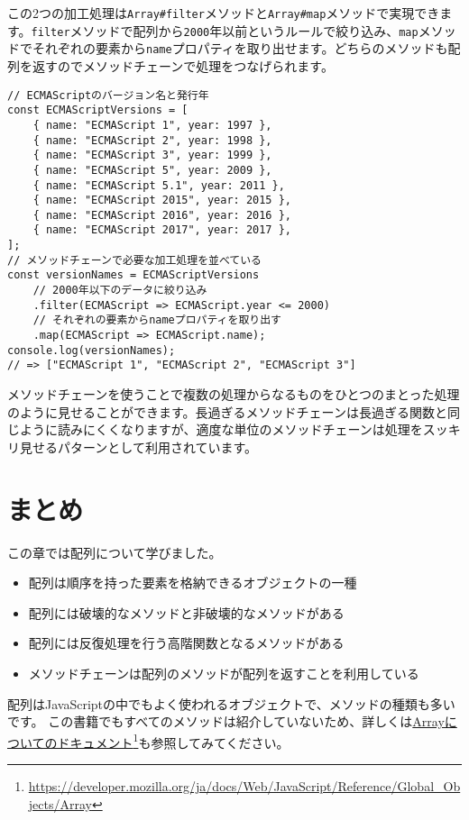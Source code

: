 この2つの加工処理は\texttt{Array\#filter}メソッドと\texttt{Array\#map}メソッドで実現できます。\texttt{filter}メソッドで配列から\texttt{2000}年以前というルールで絞り込み、\texttt{map}メソッドでそれぞれの要素から\texttt{name}プロパティを取り出せます。どちらのメソッドも配列を返すのでメソッドチェーンで処理をつなげられます。

\begin{lstlisting}
// ECMAScriptのバージョン名と発行年
const ECMAScriptVersions = [
    { name: "ECMAScript 1", year: 1997 },
    { name: "ECMAScript 2", year: 1998 },
    { name: "ECMAScript 3", year: 1999 },
    { name: "ECMAScript 5", year: 2009 },
    { name: "ECMAScript 5.1", year: 2011 },
    { name: "ECMAScript 2015", year: 2015 },
    { name: "ECMAScript 2016", year: 2016 },
    { name: "ECMAScript 2017", year: 2017 },
];
// メソッドチェーンで必要な加工処理を並べている
const versionNames = ECMAScriptVersions
    // 2000年以下のデータに絞り込み
    .filter(ECMAScript => ECMAScript.year <= 2000)
    // それぞれの要素からnameプロパティを取り出す
    .map(ECMAScript => ECMAScript.name);
console.log(versionNames); 
// => ["ECMAScript 1", "ECMAScript 2", "ECMAScript 3"]
\end{lstlisting}

メソッドチェーンを使うことで複数の処理からなるものをひとつのまとった処理のように見せることができます。長過ぎるメソッドチェーンは長過ぎる関数と同じように読みにくくなりますが、適度な単位のメソッドチェーンは処理をスッキリ見せるパターンとして利用されています。

\hypertarget{conclusion}{%
\section{まとめ}\label{conclusion}}

この章では配列について学びました。

\begin{itemize}
\item
  配列は順序を持った要素を格納できるオブジェクトの一種
\item
  配列には破壊的なメソッドと非破壊的なメソッドがある
\item
  配列には反復処理を行う高階関数となるメソッドがある
\item
  メソッドチェーンは配列のメソッドが配列を返すことを利用している
\end{itemize}

配列はJavaScriptの中でもよく使われるオブジェクトで、メソッドの種類も多いです。
この書籍でもすべてのメソッドは紹介していないため、詳しくは\href{https://developer.mozilla.org/ja/docs/Web/JavaScript/Reference/Global_Objects/Array}{Arrayについてのドキュメント}\footnote{\url{https://developer.mozilla.org/ja/docs/Web/JavaScript/Reference/Global_Objects/Array}}も参照してみてください。

